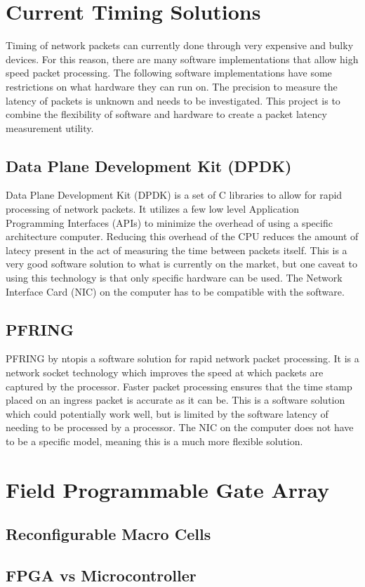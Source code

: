 \section{Current Timing Solutions}

\par Timing of network packets can currently done through very expensive and bulky devices. 
For this reason, there are many software implementations that allow high speed packet processing.
The following software implementations have some restrictions on what hardware they can run on.
The precision to measure the latency of packets is unknown and needs to be investigated.
This project is to combine the flexibility of software and hardware to create a packet latency measurement utility.

\subsection{Data Plane Development Kit (DPDK)}

\par Data Plane Development Kit (DPDK) is a set of C libraries to allow for rapid processing of network packets.
It utilizes a few low level Application Programming Interfaces (APIs) to minimize the overhead of using a specific architecture computer.
Reducing this overhead of the CPU reduces the amount of latecy present in the act of measuring the time between packets itself.
This is a very good software solution to what is currently on the market, but one caveat to using this technology is that only specific hardware can be used.
The Network Interface Card (NIC) on the computer has to be compatible with the software.

\subsection{PF\textunderscore RING}

\par PF\textunderscore RING by ntop\texttrademark is a software solution for rapid network packet processing.
It is a network socket technology which improves the speed at which packets are captured by the processor.
Faster packet processing ensures that the time stamp placed on an ingress packet is accurate as it can be.
This is a software solution which could potentially work well, but is limited by the software latency of needing to be processed by a processor.
The NIC on the computer does not have to be a specific model, meaning this is a much more flexible solution.

\section{Field Programmable Gate Array}

\subsection{Reconfigurable Macro Cells}

\subsection{FPGA vs Microcontroller}
